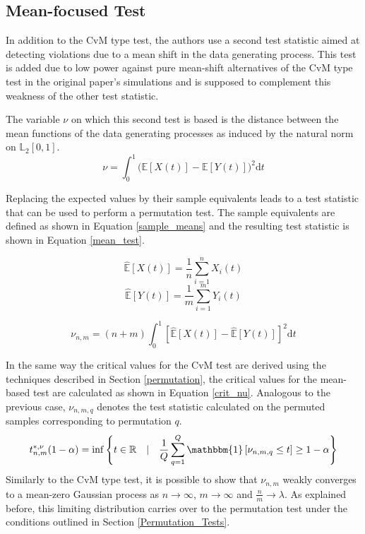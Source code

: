 \documentclass[12pt, a4paper]{article}
\theoremstyle{MAstyle} \newtheorem{assumption}{Assumption}[section]
\theoremstyle{MAstyle} \newtheorem{definition}{Definition}[section]
\theoremstyle{MAstyle} \newtheorem{theorem}{Theorem}[section]
\begin{document}
		\subsection{Mean-focused Test}\label{mean_based_test}
			In addition to the CvM type test, the authors use a second test statistic aimed at detecting violations due to a mean shift in the data generating process. This test is added due to low power against pure mean-shift alternatives of the CvM type test in the original paper's simulations and is supposed to complement this weakness of the other test statistic.
			
			The variable $\nu$ on which this second test is based is the distance between the mean functions of the data generating processes as induced by the natural norm on $\mathbb{L}_2[0,1]$.
			\begin{equation}
				\nu = \int_{0}^{1} \big(\mathbb{E}\left[X(t)\right] - \mathbb{E}\left[Y(t)\right]\big)^2 \mathrm{d}t
			\end{equation}
		
			Replacing the expected values by their sample equivalents leads to a test statistic that can be used to perform a permutation test. The sample equivalents are defined as shown in Equation \ref{sample_means} and the resulting test statistic is shown in Equation \ref{mean_test}.
			\begin{multicols}{2}
				\noindent
				\begin{equation*}
					\hat{\mathbb{E}}\left[X(t)\right] = \frac{1}{n}\sum_{i = 1}^{n} X_i(t)
				\end{equation*}
				\begin{equation}\label{sample_means}
					\hat{\mathbb{E}}\left[Y(t)\right] = \frac{1}{m}\sum_{i = 1}^{m} Y_i(t)
				\end{equation}
			\end{multicols}
			\begin{equation}\label{mean_test}
				\nu_{n,m} = (n+m) \int_{0}^{1} \left[\hat{\mathbb{E}}\left[X(t)\right] - \hat{\mathbb{E}}\left[Y(t)\right] \right]^2 \mathrm{d}t
			\end{equation}
		
			In the same way the critical values for the CvM test are derived using the techniques described in Section \ref{permutation}, the critical values for the mean-based test are calculated as shown in Equation \ref{crit_nu}. Analogous to the previous case, $\nu_{n,m,q}$ denotes the test statistic  calculated on the permuted samples corresponding to permutation $q$.
			\begin{equation}\label{crit_nu}
				t^{*, \nu}_{n,m}(1-\alpha) = \inf \left\{t \in \mathbb{R} \quad \vert \quad \frac{1}{Q} \sum_{q = 1}^{Q} \mathbbm{1}\left[\nu_{n,m,q} \leq t\right] \geq 1 - \alpha \right\}
			\end{equation}
			Similarly to the CvM type test, it is possible to show that $\nu_{n,m}$ weakly converges to a mean-zero Gaussian process as $n \rightarrow \infty$, $m \rightarrow \infty$ and $\frac{n}{m} \rightarrow \lambda$. As explained before, this limiting distribution carries over to the permutation test under the conditions outlined in Section \ref{Permutation_Tests}.
\end{document}
